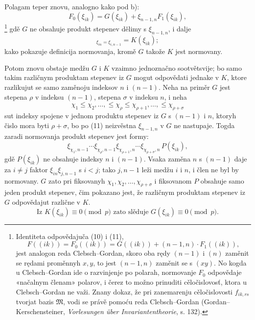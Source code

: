 \documentclass[11pt]{article}
\providecommand{\frM}{\mathfrak M}
\begin{document}
Polagam teper znovu, analogno kako pod b):
\begin{equation}
        F_0(\xi_{ik})=G(\xi_{ik})+\xi_{n-1,n}F_1(\xi_{ik}),
\end{equation}
\footnote{Identiteta odpovědajuča (10) i (11),
        \[
          F((ik))=F_0((ik))=G((ik))+(n-1,n)\cdot F_1((ik)),
        \]
        jest analogon reda Clebsch--Gordan, skoro oba rędy \((n-1)\) i \((n)\) zaměnit se rędami proměnnyh \(x,y\), to jest \((n-1,n)\) zaměnit se s \((xy)\). No kogda u Clebsch--Gordan ide o razvinjenje po polarah, normovanje \(F_0\) odpovědaje «načalnym členam» polarov, i čerez to možno prinuditi cěločislovosť, ktora u Clebsch--Gordan ne važi. Znany dokaz, že pri zanemarenju cěločislovosti \(f_{ik,rs}\) tvorjat bazis \(\frM\), vodi se právě pomoću reda Clebsch--Gordan (Gordan--Kerschensteiner, \emph{Vorlesungen über Invariantentheorie}, s. 132).}
gdě \(G\) ne obsahuje produkt stepenev dělimy s \(\xi_{n-1,n}\), i dalje
\begin{equation}
        [G]_{\xi_{in}=\xi_{i,n-1}}=K(\xi_{ik});
\end{equation}
kako pokazuje definicija normovanja, kromě \(G\) takože \(K\) jest normovany.

Potom znovu obstaje medžu \(G\) i \(K\) vzaimno jednoznačno sootvětsvije; bo samo takim različnym produktam stepenev iz \(G\) mogut odpovědati jednake v \(K\), ktore razlikujut se samo zaměnoju indeksov \(n\) i \((n-1)\). Neha na priměr \(G\) jest stepena \(\rho\) v indeksu \((n-1)\), stepena \(\sigma\) v indeksu \(n\), i neha
\[
        \chi_1\le\chi_2,\ldots,\le\chi_\rho\le\chi_{\rho+1},\ldots,\le\chi_{\rho+\sigma}
\]
sut indeksy spojene v jednom produktu stepenev iz \(G\) s \((n-1)\) i \(n\), ktoryh čislo mora byti \(\rho+\sigma\), bo po (11) neizvěstna \(\xi_{n-1,n}\) v \(G\) ne nastupaje. Togda zaradi normovanja produkt stepenev jest formy:
\[
        \xi_{\chi_1,n-1}\cdots\xi_{\chi_\rho,n-1}
        \xi_{\chi_{\rho+1},n}\cdots\xi_{\chi_{\rho+\sigma},n}\,P(\xi_{ik}),
\]
gdě \(P(\xi_{ik})\) ne obsahuje indeksy \(n\) i \((n-1)\). Vsaka zaměna \(n\) s \((n-1)\) daje za \(i\ne j\) faktor \(\xi_{in}\xi_{j,n-1}\) s \(i<j\); tako \(j,n-1\) leži medžu \(i\) i \(n\), i člen ne byl by normovany. \(G\) zato pri fiksovanyh \(\chi_1,\chi_2,\ldots,\chi_{\rho+\sigma}\) i fiksovanom \(P\) obsahuje samo jeden produkt stepenev, čim pokazano jest, že različnym produktam stepenev iz \(G\) odpovědajut različne v \(K\).
\begin{equation}
        \text{Iz }K(\xi_{ik})\equiv0\pmod p\text{ zato slěduje }G(\xi_{ik})\equiv0\pmod p.
\end{equation}
\end{document}
